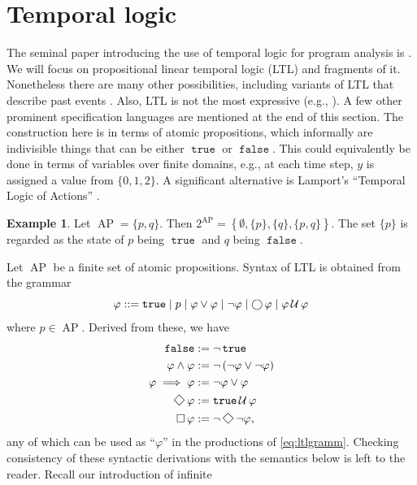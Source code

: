 \documentclass{amsart}
\DeclareMathOperator{\ap}{AP}
\DeclareMathOperator{\true}{\mathtt{true}}
\DeclareMathOperator{\false}{\mathtt{false}}
\theoremstyle{plain}
\theoremstyle{definition}
\theoremstyle{definition}
\newtheorem{examp}{Example}
\begin{document}


\section{Temporal logic}\label{sec:tl}

The seminal paper introducing the use of temporal logic for program analysis is
\cite{Pnueli1977}.  We will focus on propositional linear temporal logic (LTL)
and fragments of it.  Nonetheless there are many other possibilities, including
variants of LTL that describe past events \cite{Emerson1990}. Also, LTL is not
the most expressive (e.g., \cite{Wolper1983}).  A few other prominent
specification languages are mentioned at the end of this section.  The
construction here is in terms of atomic propositions, which informally are
indivisible things that can be either $\true$ or $\false$.  This could
equivalently be done in terms of variables over finite domains, e.g., at each
time step, $y$ is assigned a value from $\{0,1,2\}$.  A significant alternative
is Lamport's ``Temporal Logic of Actions'' \cite{Lamport1994}.
\begin{examp}
Let $\ap = \{ p, q \}$.  Then $2^{\ap} = \left\{ \emptyset, \{p\}, \{q\} ,
\{p,q\}\right\}$.  The set $\{ p \}$ is regarded as the state of $p$ being
$\true$ and $q$ being $\false$.
\end{examp}
Let $\ap$ be a finite set of atomic propositions.  Syntax of LTL is obtained
from the grammar
\begin{equation}\label{eq:ltlgramm}
\varphi ::= \true \mid p \mid \varphi \vee \varphi \mid \neg \varphi \mid \Xnext \varphi \mid \varphi \Uuntil \varphi
\end{equation}
where $p\in\ap$.  Derived from these, we have
\begin{align*}
\false & := \neg \true \\
\varphi \wedge \varphi & := \neg \left( \neg \varphi \vee \neg \varphi \right ) \\
\varphi \implies \varphi & := \neg \varphi \vee \varphi \\
\Feventually \varphi & := \true \Uuntil \varphi \\
\Galways \varphi & := \neg \Feventually \neg \varphi ,
\end{align*}
any of which can be used as ``$\varphi$'' in the productions of
\eqref{eq:ltlgramm}.  Checking consistency of these syntactic derivations with
the semantics below is left to the reader.  Recall our introduction of infinite
\end{document}
